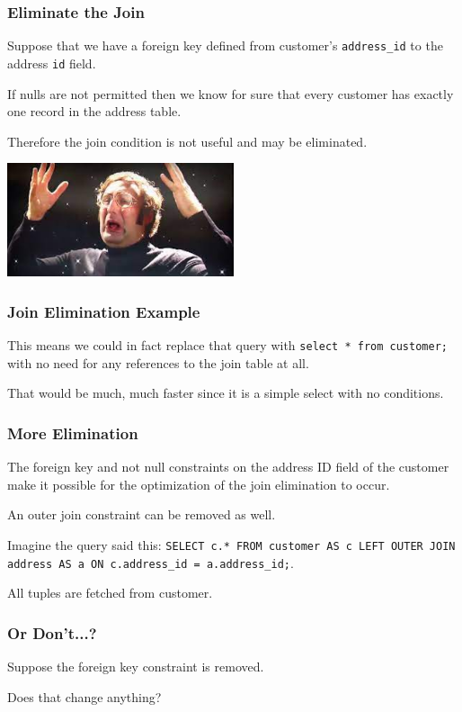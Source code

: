 \begin{frame}
\frametitle{Eliminate the Join}

Suppose that we have a foreign key defined from customer's \texttt{address\_id} to the address \texttt{id} field. 

If nulls are not permitted then we know for sure that every customer has exactly one record in the address table.

Therefore the join condition is not useful and may be eliminated. 

\begin{center}
	\includegraphics[width=0.5\textwidth]{images/mindblown.jpg}
\end{center}


\end{frame}

\begin{frame}
\frametitle{Join Elimination Example}

This means we could in fact replace that query with \texttt{select * from customer;} with no need for any references to the join table at all. 

That would be much, much faster since it is a simple select with no conditions.


\end{frame}

\begin{frame}
\frametitle{More Elimination}

The foreign key and not null constraints on the address ID field of the customer make it possible for the optimization of the join elimination to occur.

An outer join constraint can be removed as well.

Imagine the query said this: \texttt{SELECT c.* FROM customer AS c LEFT OUTER JOIN address AS a ON c.address\_id = a.address\_id;}. 

All tuples are fetched from customer.

\end{frame}

\begin{frame}
\frametitle{Or Don't...?}

Suppose the foreign key constraint is removed. 

Does that change anything?

\end{frame}

